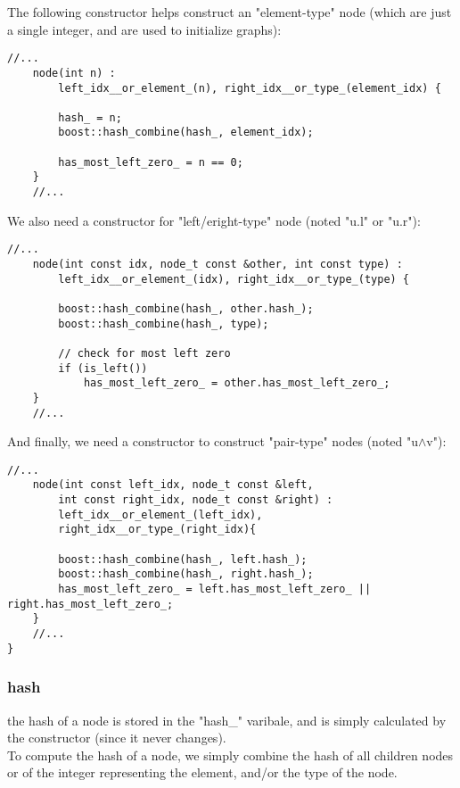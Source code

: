 \documentclass[11pt]{article}
\begin{document}
The following constructor helps construct an "element-type" node (which are just a single integer, and are used to initialize graphs):

\begin{lstlisting}[style=CStyle]
	//...
	node(int n) :
		left_idx__or_element_(n), right_idx__or_type_(element_idx) {

		hash_ = n;
		boost::hash_combine(hash_, element_idx);
		
		has_most_left_zero_ = n == 0;
	}
	//...
\end{lstlisting}

We also need a constructor for "left/eright-type" node (noted "u.l" or "u.r"):

\begin{lstlisting}[style=CStyle]
	//...
	node(int const idx, node_t const &other, int const type) :
		left_idx__or_element_(idx), right_idx__or_type_(type) {
		
		boost::hash_combine(hash_, other.hash_);
		boost::hash_combine(hash_, type);

		// check for most left zero
		if (is_left())
			has_most_left_zero_ = other.has_most_left_zero_;
	}
	//...
\end{lstlisting}

And finally, we need a constructor to construct "pair-type" nodes (noted "u$\wedge$v"):

\begin{lstlisting}[style=CStyle]
	//...
	node(int const left_idx, node_t const &left,
		int const right_idx, node_t const &right) :
		left_idx__or_element_(left_idx),
		right_idx__or_type_(right_idx){

		boost::hash_combine(hash_, left.hash_);
		boost::hash_combine(hash_, right.hash_);
		has_most_left_zero_ = left.has_most_left_zero_ || right.has_most_left_zero_;
	}
	//...
}
\end{lstlisting}

\subsubsection{hash}

the hash of a node is stored in the "hash\_" varibale, and is simply calculated by the constructor (since it never changes).\\

To compute the hash of a node, we simply combine the hash of all children nodes or of the integer representing the element, and/or the type of the node.
\end{document}
